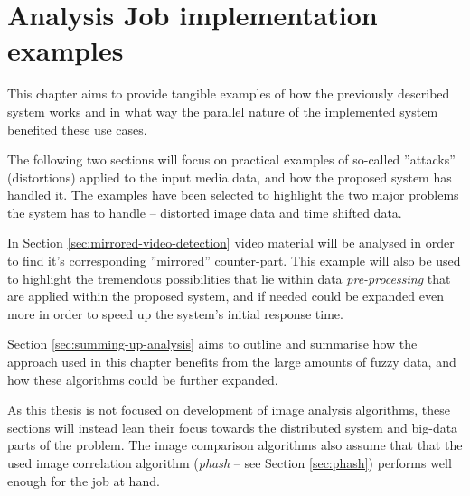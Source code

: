 \chapter{Analysis Job implementation examples}
\label{chap:analysis-examples}

This chapter aims to provide tangible examples of how the previously described system works and in what way the parallel nature of the implemented system benefited these use cases.

The following two sections will focus on practical examples of so-called ''attacks'' (distortions) applied to the input media data, and how the proposed system has handled it. The examples have been selected to highlight the two major problems the system has to handle -- distorted image data and time shifted data.

In Section \ref{sec:mirrored-video-detection} video material will be analysed in order to find it's corresponding ''mirrored'' counter-part. This example will also be used to highlight the tremendous possibilities that lie within data \textit{pre-processing} that are applied within the proposed system, and if needed could be expanded even more in order to speed up the system's initial response time.


Section \ref{sec:summing-up-analysis} aims to outline and summarise how the approach used in this chapter benefits from the large amounts of fuzzy data, and how these algorithms could be further expanded.

As this thesis is not focused on development of image analysis algorithms, these sections will instead lean their focus towards the distributed system and big-data parts of the problem. The image comparison algorithms also assume that that the used image correlation algorithm (\textit{phash} -- see Section \ref{sec:phash}) performs well enough for the job at hand. 


